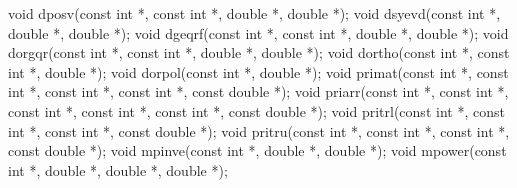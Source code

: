 \documentclass[12pt,]{article}
\newenvironment{Shaded}{\begin{snugshade}}{\end{snugshade}}
\newcommand{\DataTypeTok}[1]{\textcolor[rgb]{0.13,0.29,0.53}{#1}}
\newcommand{\NormalTok}[1]{#1}
\begin{document}
\begin{Shaded}
\begin{Highlighting}[]
\DataTypeTok{void}\NormalTok{ dposv(}\DataTypeTok{const} \DataTypeTok{int}\NormalTok{ *, }\DataTypeTok{const} \DataTypeTok{int}\NormalTok{ *, }\DataTypeTok{double}\NormalTok{ *, }\DataTypeTok{double}\NormalTok{ *);}
\DataTypeTok{void}\NormalTok{ dsyevd(}\DataTypeTok{const} \DataTypeTok{int}\NormalTok{ *, }\DataTypeTok{double}\NormalTok{ *, }\DataTypeTok{double}\NormalTok{ *);}
\DataTypeTok{void}\NormalTok{ dgeqrf(}\DataTypeTok{const} \DataTypeTok{int}\NormalTok{ *, }\DataTypeTok{const} \DataTypeTok{int}\NormalTok{ *, }\DataTypeTok{double}\NormalTok{ *, }\DataTypeTok{double}\NormalTok{ *);}
\DataTypeTok{void}\NormalTok{ dorgqr(}\DataTypeTok{const} \DataTypeTok{int}\NormalTok{ *, }\DataTypeTok{const} \DataTypeTok{int}\NormalTok{ *, }\DataTypeTok{double}\NormalTok{ *, }\DataTypeTok{double}\NormalTok{ *);}
\DataTypeTok{void}\NormalTok{ dortho(}\DataTypeTok{const} \DataTypeTok{int}\NormalTok{ *, }\DataTypeTok{const} \DataTypeTok{int}\NormalTok{ *, }\DataTypeTok{double}\NormalTok{ *);}
\DataTypeTok{void}\NormalTok{ dorpol(}\DataTypeTok{const} \DataTypeTok{int}\NormalTok{ *, }\DataTypeTok{double}\NormalTok{ *);}
\DataTypeTok{void}\NormalTok{ primat(}\DataTypeTok{const} \DataTypeTok{int}\NormalTok{ *, }\DataTypeTok{const} \DataTypeTok{int}\NormalTok{ *, }\DataTypeTok{const} \DataTypeTok{int}\NormalTok{ *, }\DataTypeTok{const} \DataTypeTok{int}\NormalTok{ *, }\DataTypeTok{const} \DataTypeTok{double}\NormalTok{ *);}
\DataTypeTok{void}\NormalTok{ priarr(}\DataTypeTok{const} \DataTypeTok{int}\NormalTok{ *, }\DataTypeTok{const} \DataTypeTok{int}\NormalTok{ *, }\DataTypeTok{const} \DataTypeTok{int}\NormalTok{ *, }\DataTypeTok{const} \DataTypeTok{int}\NormalTok{ *, }\DataTypeTok{const} \DataTypeTok{int}\NormalTok{ *,}
            \DataTypeTok{const} \DataTypeTok{double}\NormalTok{ *);}
\DataTypeTok{void}\NormalTok{ pritrl(}\DataTypeTok{const} \DataTypeTok{int}\NormalTok{ *, }\DataTypeTok{const} \DataTypeTok{int}\NormalTok{ *, }\DataTypeTok{const} \DataTypeTok{int}\NormalTok{ *, }\DataTypeTok{const} \DataTypeTok{double}\NormalTok{ *);}
\DataTypeTok{void}\NormalTok{ pritru(}\DataTypeTok{const} \DataTypeTok{int}\NormalTok{ *, }\DataTypeTok{const} \DataTypeTok{int}\NormalTok{ *, }\DataTypeTok{const} \DataTypeTok{int}\NormalTok{ *, }\DataTypeTok{const} \DataTypeTok{double}\NormalTok{ *);}
\DataTypeTok{void}\NormalTok{ mpinve(}\DataTypeTok{const} \DataTypeTok{int}\NormalTok{ *, }\DataTypeTok{double}\NormalTok{ *, }\DataTypeTok{double}\NormalTok{ *);}
\DataTypeTok{void}\NormalTok{ mpower(}\DataTypeTok{const} \DataTypeTok{int}\NormalTok{ *, }\DataTypeTok{double}\NormalTok{ *, }\DataTypeTok{double}\NormalTok{ *, }\DataTypeTok{double}\NormalTok{ *);}

\end{Highlighting}
\end{Shaded}
\end{document}
